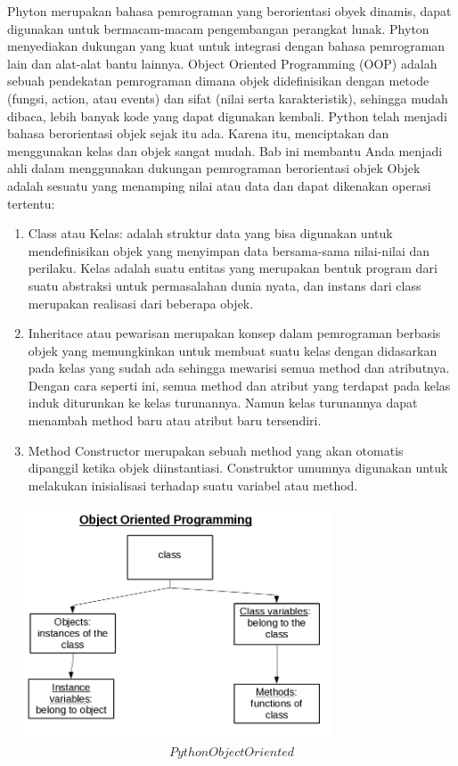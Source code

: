 Phyton merupakan bahasa pemrograman yang berorientasi obyek dinamis, dapat digunakan untuk bermacam-macam pengembangan perangkat lunak. Phyton menyediakan dukungan yang kuat untuk integrasi dengan bahasa pemrograman lain dan alat-alat bantu lainnya.
Object Oriented Programming (OOP) adalah sebuah pendekatan pemrograman dimana objek didefinisikan dengan metode (fungsi, action, atau events) dan sifat (nilai serta karakteristik), sehingga mudah dibaca, lebih banyak kode yang dapat digunakan kembali.
Python telah menjadi bahasa berorientasi objek sejak itu ada. Karena itu, menciptakan dan menggunakan kelas dan objek sangat mudah. Bab ini membantu Anda menjadi ahli dalam menggunakan dukungan pemrograman berorientasi objek
Objek adalah sesuatu yang menamping nilai atau data dan dapat dikenakan operasi tertentu:
\begin {enumerate}
\item Class atau Kelas: adalah struktur data yang bisa digunakan untuk mendefinisikan objek yang menyimpan data bersama-sama nilai-nilai dan perilaku. Kelas adalah suatu entitas yang merupakan bentuk program dari suatu abstraksi untuk permasalahan dunia nyata, dan instans dari class merupakan realisasi dari beberapa objek.
\item Inheritace atau pewarisan merupakan konsep dalam pemrograman berbasis objek yang memungkinkan untuk membuat suatu kelas dengan didasarkan pada kelas yang sudah ada sehingga mewarisi semua method dan atributnya. Dengan cara seperti ini, semua method dan atribut yang terdapat pada kelas induk diturunkan ke kelas turunannya. Namun kelas turunannya dapat menambah method baru atau atribut baru tersendiri.
\item Method Constructor merupakan sebuah method yang akan otomatis dipanggil ketika objek diinstantiasi. Construktor umumnya digunakan untuk melakukan inisialisasi terhadap suatu variabel atau method.
\end {enumerate}

\includegraphics[width=10cm,height=7cm]{Gambar/dapi4.jpg}
\begin{equation}Python Object Oriented\end{equation}

